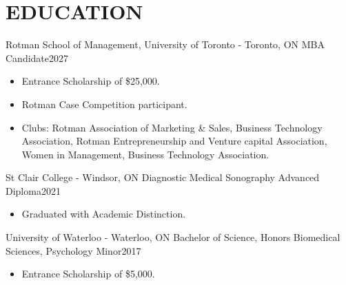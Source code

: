 
\section{\textcolor{airforceblue}{EDUCATION}}
  \employmentSubheadingListStart
    \employmentSubheading
      {Rotman School of Management, University of Toronto - Toronto, ON}{}
      {MBA Candidate}{2027}
      \begin{itemize}[leftmargin=1.5em]
        \item Entrance Scholarship of \$25,000.
        \item Rotman Case Competition participant.
        \item Clubs: Rotman Association of Marketing \& Sales, Business Technology Association, Rotman Entrepreneurship and Venture capital Association, Women in Management, Business Technology Association.
      \end{itemize}
    \employmentSubheading
      {St Clair College - Windsor, ON}{}
      {Diagnostic Medical Sonography Advanced Diploma}{2021}
      \begin{itemize}[leftmargin=1.5em]
        \item Graduated with Academic Distinction.
      \end{itemize}
    \employmentSubheading
      {University of Waterloo - Waterloo, ON}{}
      {Bachelor of Science, Honors Biomedical Sciences, Psychology Minor}{2017}
      \begin{itemize}[leftmargin=1.5em]
        \item Entrance Scholarship of \$5,000.
      \end{itemize}
  \employmentSubheadingListEnd
  \vspace{-16pt}
